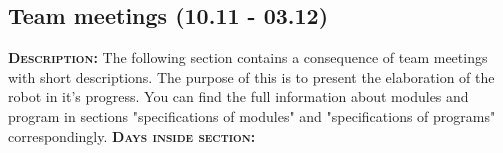 \subsection{Team meetings (10.11 - 03.12)}
	\textsc{\textbf{Description:}} The following section contains a consequence of team meetings with short descriptions. The purpose of this is to present the elaboration of the robot in it's progress. You can find the full information about modules and program in sections "specifications of modules" and "specifications of programs" correspondingly. \newline
	\textsc{\textbf{Days inside section:}}
	
	
